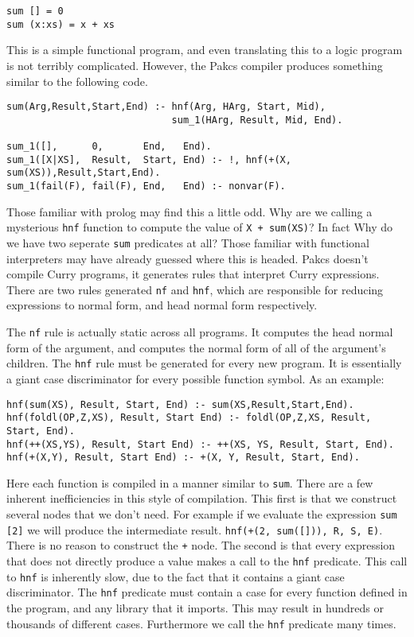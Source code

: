 \begin{verbatim}
sum [] = 0
sum (x:xs) = x + xs
\end{verbatim}

This is a simple functional program, and even translating this to a logic program is not terribly complicated.
However, the Pakcs compiler produces something similar to the following code.

\begin{verbatim}
sum(Arg,Result,Start,End) :- hnf(Arg, HArg, Start, Mid),
                             sum_1(HArg, Result, Mid, End).

sum_1([],      0,       End,   End).
sum_1([X|XS],  Result,  Start, End) :- !, hnf(+(X, sum(XS)),Result,Start,End).
sum_1(fail(F), fail(F), End,   End) :- nonvar(F).
\end{verbatim}

Those familiar with prolog may find this a little odd.
Why are we calling a mysterious \texttt{hnf} function to compute the value of \texttt{X + sum(XS)}?
In fact Why do we have two seperate \texttt{sum} predicates at all?
Those familiar with functional interpreters may have already guessed where this is headed.
Pakcs doesn't compile Curry programs, it generates rules that interpret Curry expressions.
There are two rules generated \texttt{nf} and \texttt{hnf}, which are responsible for reducing expressions
to normal form, and head normal form respectively.

The \texttt{nf} rule is actually static across all programs.  It computes the head normal form of the argument,
and computes the normal form of all of the argument's children.
The \texttt{hnf} rule must be generated for every new program.
It is essentially a giant case discriminator for every possible function symbol.
As an example:

\begin{verbatim}
hnf(sum(XS), Result, Start, End) :- sum(XS,Result,Start,End).
hnf(foldl(OP,Z,XS), Result, Start End) :- foldl(OP,Z,XS, Result, Start, End).
hnf(++(XS,YS), Result, Start End) :- ++(XS, YS, Result, Start, End).
hnf(+(X,Y), Result, Start End) :- +(X, Y, Result, Start, End).
\end{verbatim}

Here each function is compiled in a manner similar to \texttt{sum}.
There are a few inherent inefficiencies in this style of compilation.
This first is that we construct several nodes that we don't need.
For example if we evaluate the expression \texttt{sum [2]} we will produce the intermediate result.
\texttt{hnf(+(2, sum([])), R, S, E)}.
There is no reason to construct the \texttt + node.
The second is that every expression that does not directly produce a value makes a call to the \texttt{hnf}
predicate.
This call to \texttt{hnf} is inherently slow, due to the fact that it contains a giant case discriminator.
The \texttt{hnf} predicate must contain a case for every function defined in the program, and any library that it imports.
This may result in hundreds or thousands of different cases.  Furthermore we call the \texttt{hnf} predicate many times.

